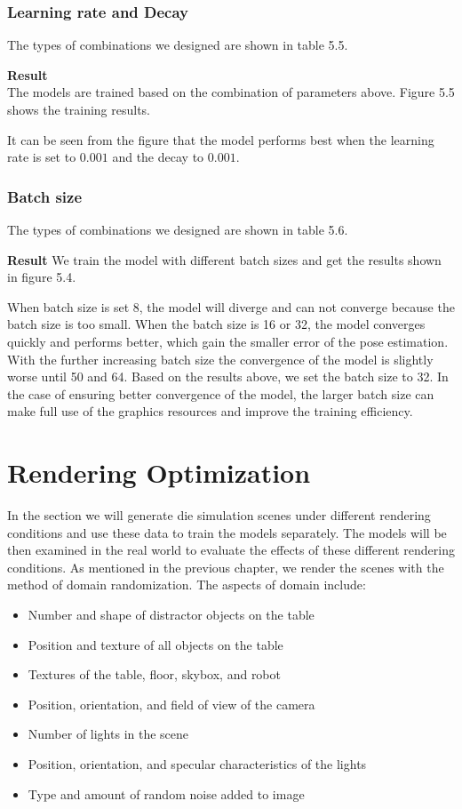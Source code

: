 \subsubsection*{Learning rate and Decay}
The types of combinations we designed are shown in table 5.5.


\textbf{Result}\\
The models are trained based on the combination of parameters above. Figure 5.5 shows the training results.

\todo It can be seen from the figure that the model performs best when the learning rate is set to $0.001$ and the decay to $0.001$.

\subsubsection*{Batch size}
The types of combinations we designed are shown in table 5.6.

\textbf{Result}
We train the model with different batch sizes and get the results shown in figure 5.4.
\missingfigure{}


When batch size is set 8, the model will diverge and can not converge because the batch size is too small. When the batch size is 16 or 32, the model converges quickly and performs better, which gain the smaller error of the pose estimation. With the further increasing batch size the convergence of the model is slightly worse until 50 and 64. Based on the results above, we set the batch size to 32. In the case of ensuring better convergence of the model, the larger batch size can make full use of the graphics resources and improve the training efficiency.

\section{Rendering Optimization}
In the section we will generate die simulation scenes under different rendering conditions and use these data to train the models separately. The models will be then examined in the real world to evaluate the effects of these different rendering conditions. As mentioned in the previous chapter, we render the scenes with the method of domain randomization. The aspects of domain include:

\begin{itemize}
	\item Number and shape of distractor objects on the table
	\item Position and texture of all objects on the table
	\item Textures of the table, floor, skybox, and robot
	\item Position, orientation, and field of view of the camera
	\item Number of lights in the scene
	\item Position, orientation, and specular characteristics of the lights
	\item Type and amount of random noise added to image
\end{itemize}

